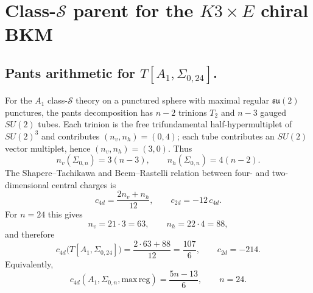 
\providecommand{\kBKM}{\kappa_{\mathrm{BKM}}}
\providecommand{\kch}{\kappa_{\mathrm{ch}}}
\providecommand{\kcat}{\kappa_{\mathrm{cat}}}
\providecommand{\kfib}{\kappa_{\mathrm{fiber}}}
\providecommand{\Ntwo}{\mathcal{N}{=}2}
\providecommand{\cS}{\mathcal{S}}
\providecommand{\R}{\mathbb{R}}
\providecommand{\C}{\mathbb{C}}
\providecommand{\Z}{\mathbb{Z}}

\section*{Class-\texorpdfstring{$\mathcal S$}{S} parent for the
\texorpdfstring{$K3\times E$}{K3xE} chiral BKM}
\label{sec:gaiotto-curve-k3e-resolution}

\subsection*{Pants arithmetic for
\texorpdfstring{$T[A_1,\Sigma_{0,24}]$}{T[A1,Sigma0,24]}.}

For the $A_1$ class-$\mathcal S$ theory on a punctured sphere with
maximal regular $\mathfrak{su}(2)$ punctures, the pants decomposition
has $n-2$ trinions $T_2$ and $n-3$ gauged $SU(2)$ tubes.  Each trinion
is the free trifundamental half-hypermultiplet of $SU(2)^3$ and
contributes $(n_v,n_h)=(0,4)$; each tube contributes an $SU(2)$ vector
multiplet, hence $(n_v,n_h)=(3,0)$.  Thus
\begin{equation}
  n_v(\Sigma_{0,n}) = 3(n-3),
  \qquad
  n_h(\Sigma_{0,n}) = 4(n-2).
  \label{eq:sphere-pants-nvnh}
\end{equation}
The Shapere--Tachikawa and Beem--Rastelli relation between four- and
two-dimensional central charges is
\begin{equation}
  c_{4d}=\frac{2n_v+n_h}{12},
  \qquad
  c_{2d}=-12\,c_{4d}.
  \label{eq:class-s-c4d-c2d}
\end{equation}
For $n=24$ this gives
\begin{equation}
  n_v=21\cdot3=63,
  \qquad
  n_h=22\cdot4=88,
  \label{eq:sigma-0-24-nvnh}
\end{equation}
and therefore
\begin{equation}
  c_{4d}\big(T[A_1,\Sigma_{0,24}]\big)
  =\frac{2\cdot63+88}{12}
  =\frac{107}{6},
  \qquad
  c_{2d}=-214.
  \label{eq:sigma-0-24-central-charges}
\end{equation}
Equivalently,
\begin{equation}
  c_{4d}(A_1,\Sigma_{0,n},\mathrm{max\,reg})
  =\frac{5n-13}{6},
  \qquad
  n=24.
  \label{eq:sphere-central-charge}
\end{equation}

